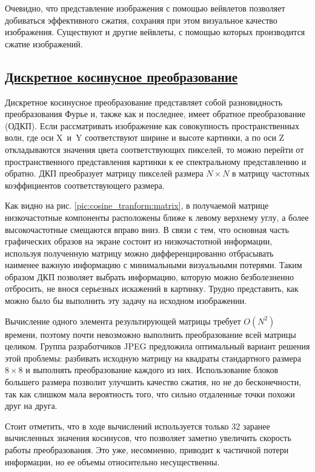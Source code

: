 
Очевидно, что представление изображения с помощью вейвлетов позволяет добиваться эффективного сжатия, сохраняя при этом визуальное качество изображения. Существуют и другие вейвлеты, с помощью которых производится сжатие изображений.

\subsection*{\hyperlink{toc}{Дискретное косинусное преобразование}}
Дискретное косинусное преобразование представляет собой разновидность преобразования Фурье и, также как и последнее, имеет обратное преобразование (ОДКП). Если рассматривать изображение как совокупность пространственных волн, где оси X~и~Y соответствуют ширине и высоте картинки, а по оси Z откладываются значения цвета соответствующих пикселей, то можно перейти от пространственного представления картинки к ее спектральному представлению и обратно. ДКП преобразует матрицу пикселей размера $N \times N$ в матрицу частотных коэффициентов соответствующего размера.

Как видно на рис. \ref{pic:cosine_tranform:matrix}, в получаемой матрице низкочастотные компоненты расположены ближе к левому верхнему углу, а более высокочастотные смещаются вправо вниз. В связи с тем, что основная часть графических образов на экране состоит из низкочастотной информации, используя полученную матрицу можно дифференцированно отбрасывать наименее важную информацию с минимальными визуальными потерями. Таким образом ДКП позволяет выбрать информацию, которую можно безболезненно отбросить, не внося серьезных искажений в картинку. Трудно представить, как можно было бы выполнить эту задачу на исходном изображении.

Вычисление одного элемента результирующей матрицы требует $O(N^2)$ времени, поэтому почти невозможно выполнить преобразование всей матрицы целиком. Группа разработчиков JPEG предложила оптимальный вариант решения этой проблемы: разбивать исходную матрицу на квадраты стандартного размера $8\times8$ и выполнять преобразование каждого из них. Использование блоков большего размера позволит улучшить качество сжатия, но не до бесконечности, так как слишком мала вероятность того, что сильно отдаленные точки похожи друг на друга.

Стоит отметить, что в ходе вычислений используется только 32 заранее вычисленных значения косинусов, что позволяет заметно увеличить скорость работы преобразования. Это уже, несомненно, приводит к частичной потери информации, но ее объемы относительно несущественны.

